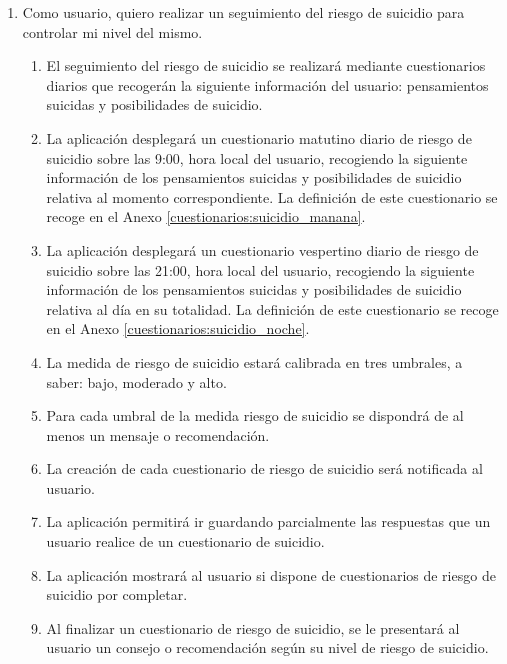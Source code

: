         \begin{enumerate}[resume=req-usuario,label=\textbf{\texttt{RU-\arabic*}}]
            \item \label{req:usuario:seguimiento_suicidio}  Como usuario, quiero realizar un seguimiento del riesgo de suicidio para controlar mi nivel del mismo.
            \begin{enumerate}[resume=req-funcionales,label=\textbf{\texttt{RF-\arabic*}}]
                \item \label{req:funcionales:suicidio_diario_info} El seguimiento del riesgo de suicidio se realizará mediante cuestionarios diarios que recogerán la siguiente información del usuario: pensamientos suicidas y posibilidades de suicidio.
                \item \label{req:funcionales:suicidio_diario_manana} La aplicación desplegará un cuestionario matutino diario de riesgo de suicidio sobre las 9:00, hora local del usuario, recogiendo la siguiente información de los pensamientos suicidas y posibilidades de suicidio relativa al momento correspondiente. La definición de este cuestionario se recoge en el Anexo \ref{cuestionarios:suicidio_manana}.
                \item \label{req:funcionales:suicidio_diario_noche}  La aplicación desplegará un cuestionario vespertino diario de riesgo de suicidio sobre las 21:00, hora local del usuario, recogiendo la siguiente información de los pensamientos suicidas y posibilidades de suicidio relativa al día en su totalidad. La definición de este cuestionario se recoge en el Anexo \ref{cuestionarios:suicidio_noche}.
                \item \label{req:funcionales:suicidio_umbrales} La medida de riesgo de suicidio estará calibrada en tres umbrales, a saber: bajo, moderado y alto.
                \item \label{req:funcionales:suicidio_consejo} Para cada umbral de la medida riesgo de suicidio se dispondrá de al menos un mensaje o recomendación.
                \item \label{req:funcionales:suicidio_notificacion} La creación de cada cuestionario de riesgo de suicidio será notificada al usuario.
                \item \label{req:funcionales:suicidio_cuestionario_aplazar} La aplicación permitirá ir guardando parcialmente las respuestas que un usuario realice de un cuestionario de suicidio.
                \item \label{req:funcionales:suicidio_cuestionario_pendientes} La aplicación mostrará al usuario si dispone de cuestionarios de riesgo de suicidio por completar.
                \item \label{req:funcionales:suicidio_cuestionario_consejo} Al finalizar un cuestionario de riesgo de suicidio, se le presentará al usuario un consejo o recomendación según su nivel de riesgo de suicidio.
            \end{enumerate}
        \end{enumerate}
